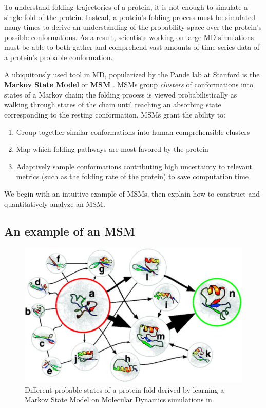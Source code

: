 \documentclass{article}
\begin{document}
To understand folding trajectories of a protein, it is not enough to simulate a single fold of the protein. Instead, a protein's folding process must be simulated many times to derive an understanding of the probability space over the protein's possible conformations. As a result, scientists working on large MD simulations must be able to both gather and comprehend vast amounts of time series data of a protein's probable conformation. 

A ubiquitously used tool in MD, popularized by the Pande lab at Stanford is the \textbf{Markov State Model} or \textbf{MSM} \cite{pande2010}. MSMs group \textit{clusters} of conformations into states of a Markov chain; the folding process is viewed probabilistically as walking through states of the chain until reaching an absorbing state corresponding to the resting conformation. MSMs grant the ability to:

\begin{enumerate}
    \item Group together similar conformations into human-comprehensible clusters
    \item Map which folding pathways are most favored by the protein
    \item Adaptively sample conformations contributing high uncertainty to relevant metrics (such as the folding rate of the protein) to save computation time
\end{enumerate}

We begin with an intuitive example of MSMs, then explain how to construct and quantitatively analyze an MSM.

\subsection{An example of an MSM}

\begin{figure}[!h]
  \includegraphics[width=\linewidth]{images/folding_pathways.jpg}
  \caption{Different probable states of a protein fold derived by learning a Markov State Model on Molecular Dynamics simulations in \cite{pande2010}}
  \label{fig:foldingPathways}
\end{figure}
\end{document}
